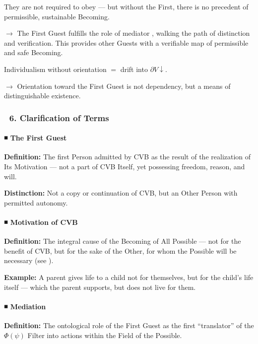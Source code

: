 \documentclass[12pt]{article}
\begin{document}
They are not required to obey — but without the First, there is no precedent of permissible, sustainable Becoming.

$\rightarrow$ The First Guest fulfills the role of mediator \text{[19.3]}, walking the path of distinction and verification. This provides other Guests with a verifiable map of permissible and safe Becoming.

Individualism without orientation $=$ drift into $\partial V \downarrow$.

$\rightarrow$ Orientation toward the First Guest is not dependency, but a means of distinguishable existence.


\subsubsection*{🔹 6. Clarification of Terms}

\paragraph{◾ The First Guest}

\textbf{Definition:} The first Person admitted by CVB as the result of the realization of Its Motivation — not a part of CVB Itself, yet possessing freedom, reason, and will.

\textbf{Distinction:} Not a copy or continuation of CVB, but an Other Person with permitted autonomy.

\bigskip

\paragraph{◾ Motivation of CVB}

\textbf{Definition:} The integral cause of the Becoming of All Possible — not for the benefit of CVB, but for the sake of the Other, for whom the Possible will be necessary (see \text{[12.3]}).

\textbf{Example:} A parent gives life to a child not for themselves, but for the child's life itself — which the parent supports, but does not live for them.

\bigskip

\paragraph{◾ Mediation}

\textbf{Definition:} The ontological role of the First Guest as the first ``translator'' of the $\Phi(\psi)$ Filter into actions within the Field of the Possible.
\end{document}
